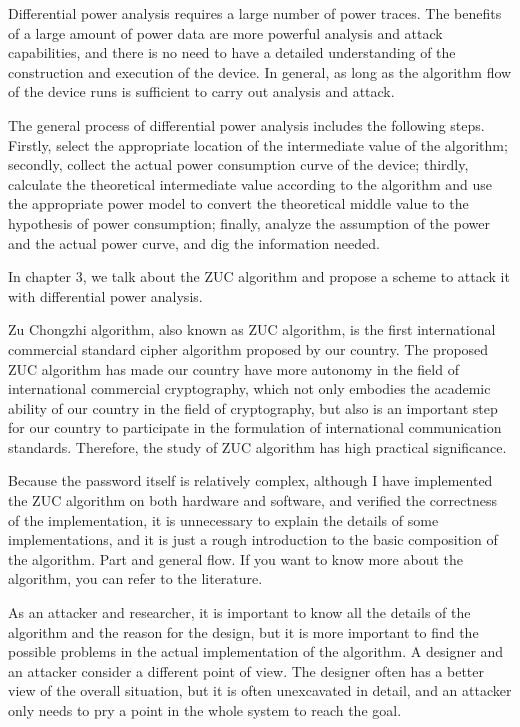 \begin{bigabstract}
Differential power analysis requires a large number of power traces. The benefits of a large amount of power data are more powerful analysis and attack capabilities, and there is no need to have a detailed understanding of the construction and execution of the device. In general, as long as the algorithm flow of the device runs is sufficient to carry out analysis and attack.

The general process of differential power analysis includes the following steps. Firstly, select the appropriate location of the intermediate value of the algorithm; secondly, collect the actual power consumption curve of the device; thirdly, calculate the theoretical intermediate value according to the algorithm and use the appropriate power model to convert the theoretical middle value to the hypothesis of power consumption; finally, analyze the assumption of the power and the actual power curve, and dig the information needed.

In chapter 3, we talk about the ZUC algorithm and propose a scheme to attack it with differential power analysis.

Zu Chongzhi algorithm, also known as ZUC algorithm, is the first international commercial standard cipher algorithm proposed by our country. The proposed ZUC algorithm has made our country have more autonomy in the field of international commercial cryptography, which not only embodies the academic ability of our country in the field of cryptography, but also is an important step for our country to participate in the formulation of international communication standards. Therefore, the study of ZUC algorithm has high practical significance.

Because the password itself is relatively complex, although I have implemented the ZUC algorithm on both hardware and software, and verified the correctness of the implementation, it is unnecessary to explain the details of some implementations, and it is just a rough introduction to the basic composition of the algorithm. Part and general flow. If you want to know more about the algorithm, you can refer to the literature.

As an attacker and researcher, it is important to know all the details of the algorithm and the reason for the design, but it is more important to find the possible problems in the actual implementation of the algorithm. A designer and an attacker consider a different point of view. The designer often has a better view of the overall situation, but it is often unexcavated in detail, and an attacker only needs to pry a point in the whole system to reach the goal.


\end{bigabstract}
